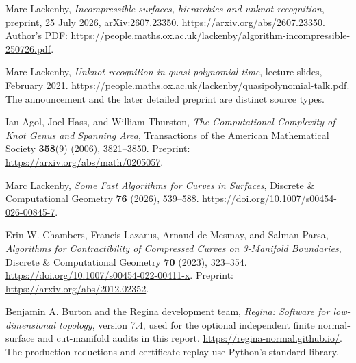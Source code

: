 Marc Lackenby, \emph{Incompressible surfaces, hierarchies and unknot
recognition}, preprint, 25 July 2026, arXiv:2607.23350.
\url{https://arxiv.org/abs/2607.23350}.
Author's PDF:
\url{https://people.maths.ox.ac.uk/lackenby/algorithm-incompressible-250726.pdf}.

Marc Lackenby, \emph{Unknot recognition in quasi-polynomial time},
lecture slides, February 2021.
\url{https://people.maths.ox.ac.uk/lackenby/quasipolynomial-talk.pdf}.
The announcement and the later detailed preprint are distinct source types.

Ian Agol, Joel Hass, and William Thurston,
\emph{The Computational Complexity of Knot Genus and Spanning Area},
Transactions of the American Mathematical Society \textbf{358}(9) (2006),
3821--3850. Preprint: \url{https://arxiv.org/abs/math/0205057}.

Marc Lackenby, \emph{Some Fast Algorithms for Curves in Surfaces},
Discrete \& Computational Geometry \textbf{76} (2026), 539--588.
\url{https://doi.org/10.1007/s00454-026-00845-7}.

Erin W. Chambers, Francis Lazarus, Arnaud de Mesmay, and Salman Parsa,
\emph{Algorithms for Contractibility of Compressed Curves on 3-Manifold
Boundaries}, Discrete \& Computational Geometry \textbf{70} (2023),
323--354. \url{https://doi.org/10.1007/s00454-022-00411-x}.
Preprint: \url{https://arxiv.org/abs/2012.02352}.

Benjamin A. Burton and the Regina development team,
\emph{Regina: Software for low-dimensional topology}, version 7.4,
used for the optional independent finite normal-surface and cut-manifold
audits in this report. \url{https://regina-normal.github.io/}.
The production reductions and certificate replay use Python's standard library.
